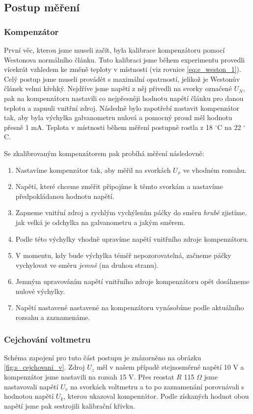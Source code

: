 \documentclass[english]{article}
\begin{document}
\subsection{Postup měření}
\subsubsection{Kompenzátor}
První věc, kterou jsme museli začít, byla kalibrace kompenzátoru pomocí Westonova normálního článku. Tuto kalibraci jsme během experimentu provedli vícekrát vzhledem ke změně teploty v místnosti (viz rovnice \ref{eq:e_weston_1}). Celý postup jsme museli provádět s maximální opatrností, jelikož je Westonův článek velmi křehký. Nejdříve jsme napětí z něj přivedli na svorky označené $U_{N}$, pak na kompenzátoru nastavili co nejpřesněji hodnotu napětí článku pro danou teplotu a zapnuli vnitřní zdroj. Následně bylo zapotřebí nastavit kompenzátor tak, aby byla výchylka galvanometru nulová a pomocný proud měl hodnotu přesně 1 mA. Teplota v místnosti během měření postupně rostla z 18 $^\circ$C na 22 $^\circ$C.

Se zkalibrovaným kompenzátorem pak probíhá měření následovně:
\begin{enumerate}
  \item Nastavíme kompenzátor tak, aby měřil na svorkách $U_{x}$ ve vhodném rozsahu.
  \item Napětí, které chceme změřit připojíme k těmto svorkám a nastavíme předpokládanou hodnotu napětí.
  \item Zapneme vnitřní zdroj a rychlým vychýlením páčky do směru \emph{hrubě} zjistíme, jak velká je odchylka na galvanometru a jakým směrem.
  \item Podle této výchylky vhodně upravíme napětí vnitřního zdroje kompenzátoru.
  \item V momentu, kdy bude výchylka téměř nepozorovatelná, začneme páčky vychylovat ve směru \emph{jemně} (na druhou stranu).
  \item Jemným upravováním napětí vnitřního zdroje kompenzátoru opět dosáhneme nulové výchylky.
  \item Napětí nastavené nastavené na kompenzátoru vynásobíme podle aktuálního rozsahu a zaznamenáme. 
\end{enumerate}

\subsubsection{Cejchování voltmetru}
Schéma zapojení pro tuto část postupu je znázorněno na obrázku \ref{fig:s_cejchovani_v}. Zdroj $U_{z}$ měl v našem případě stejnosměrné napětí 10 V a kompenzátor jsme nastavili na rozsah 15 V. Přes reostat $R$ 115 $\Omega$ jsme nastavovali napětí $U_{v}$ na svorkách voltmetru a to po zaznamenání porovnávali s hodnotou napětí $U_{k}$, kterou ukazoval kompenzátor. Podle získaných hodnot obou napětí jsme pak sestrojili kalibrační křivku. 
\end{document}

